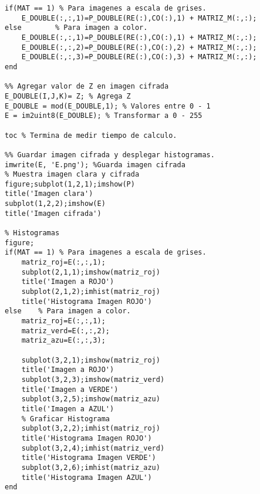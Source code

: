 \begin{lstlisting}
if(MAT == 1) % Para imagenes a escala de grises.
    E_DOUBLE(:,:,1)=P_DOUBLE(RE(:),CO(:),1) + MATRIZ_M(:,:);
else        % Para imagen a color.
    E_DOUBLE(:,:,1)=P_DOUBLE(RE(:),CO(:),1) + MATRIZ_M(:,:); 
    E_DOUBLE(:,:,2)=P_DOUBLE(RE(:),CO(:),2) + MATRIZ_M(:,:); 
    E_DOUBLE(:,:,3)=P_DOUBLE(RE(:),CO(:),3) + MATRIZ_M(:,:);
end

%% Agregar valor de Z en imagen cifrada
E_DOUBLE(I,J,K)= Z; % Agrega Z 
E_DOUBLE = mod(E_DOUBLE,1); % Valores entre 0 - 1
E = im2uint8(E_DOUBLE); % Transformar a 0 - 255

toc % Termina de medir tiempo de calculo.

%% Guardar imagen cifrada y desplegar histogramas.
imwrite(E, 'E.png'); %Guarda imagen cifrada
% Muestra imagen clara y cifrada
figure;subplot(1,2,1);imshow(P)
title('Imagen clara')
subplot(1,2,2);imshow(E)
title('Imagen cifrada')

% Histogramas
figure;
if(MAT == 1) % Para imagenes a escala de grises.
    matriz_roj=E(:,:,1);
    subplot(2,1,1);imshow(matriz_roj)
    title('Imagen a ROJO')
    subplot(2,1,2);imhist(matriz_roj)
    title('Histograma Imagen ROJO')
else    % Para imagen a color.
    matriz_roj=E(:,:,1);
    matriz_verd=E(:,:,2);
    matriz_azu=E(:,:,3);    
    
    subplot(3,2,1);imshow(matriz_roj)
    title('Imagen a ROJO')
    subplot(3,2,3);imshow(matriz_verd)
    title('Imagen a VERDE')
    subplot(3,2,5);imshow(matriz_azu)
    title('Imagen a AZUL')
    % Graficar Histograma
    subplot(3,2,2);imhist(matriz_roj)
    title('Histograma Imagen ROJO')
    subplot(3,2,4);imhist(matriz_verd)
    title('Histograma Imagen VERDE')
    subplot(3,2,6);imhist(matriz_azu)
    title('Histograma Imagen AZUL')   
end
\end{lstlisting} 